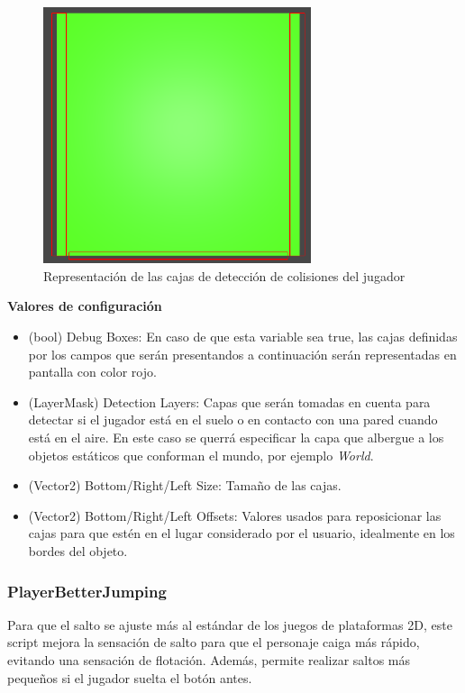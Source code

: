 \begin{figure}[t]
	\centering
	\includegraphics[width = 0.7\textwidth]{Imagenes/CollDetector.png}
	\caption{Representación de las cajas de detección de colisiones del jugador}
	\label{fig:Player_Coll_Detector}
\end{figure}

\textbf{Valores de configuración}
\begin{itemize}
	\item (bool) Debug Boxes: En caso de que esta variable sea true, las cajas definidas por los campos que serán presentandos a continuación serán representadas en pantalla con color rojo.
	\item (LayerMask) Detection Layers: Capas que serán tomadas en cuenta para detectar si el jugador está en el suelo o en contacto con una pared cuando está en el aire. En este caso se querrá especificar la capa que albergue a los objetos estáticos que conforman el mundo, por ejemplo \textit{World}.
	\item (Vector2) Bottom/Right/Left Size: Tamaño de las cajas.
	\item (Vector2) Bottom/Right/Left Offsets: Valores usados para reposicionar las cajas para que estén en el lugar considerado por el usuario, idealmente en los bordes del objeto.
\end{itemize}
\subsubsection{PlayerBetterJumping}

Para que el salto se ajuste más al estándar de los juegos de plataformas 2D, este script mejora la sensación de salto para que el personaje caiga más rápido, evitando una sensación de flotación. Además, permite realizar saltos más pequeños si el jugador suelta el botón antes.\\

